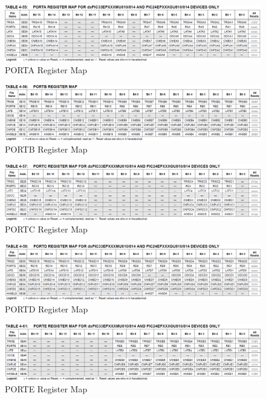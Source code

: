 \label{sec:anhang} %
\begin{figure}[h]
	\centering
	\includegraphics[width=\textwidth]{Images/PORTA}
	\caption[PORTA Register Map]{PORTA Register Map}
	\label{image:PORTA}
\end{figure}

\begin{figure}[h]
	\centering
	\includegraphics[width=\textwidth]{Images/PORTB}
	\caption[PORTB Register Map]{PORTB Register Map}
	\label{image:PORTB}
\end{figure}

\begin{figure}[h]
	\centering
	\includegraphics[width=\textwidth]{Images/PORTC}
	\caption[PORTC Register Map]{PORTC Register Map}
	\label{image:PORTC}
\end{figure}

\begin{figure}[h]
	\centering
	\includegraphics[width=\textwidth]{Images/PORTD}
	\caption[PORTD Register Map]{PORTD Register Map}
	\label{image:PORTD}
\end{figure}

\begin{figure}[h]
	\centering
	\includegraphics[width=\textwidth]{Images/PORTE}
	\caption[PORTE Register Map]{PORTE Register Map}
	\label{image:PORTE}
\end{figure}


